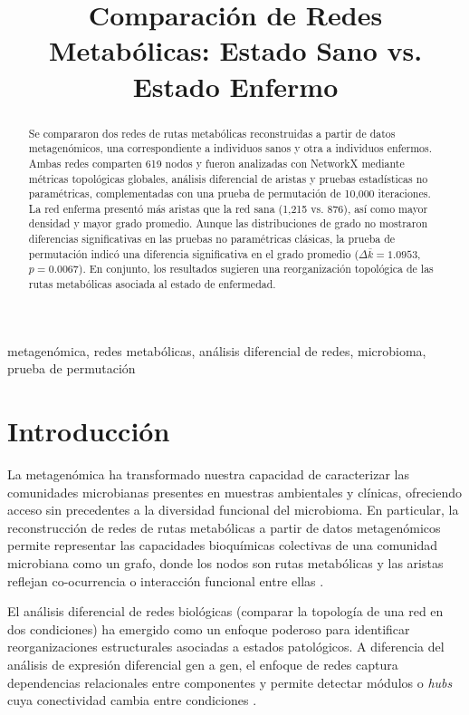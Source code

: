 \documentclass[conference]{IEEEtran}
\title{Comparación de Redes Metabólicas: Estado Sano vs. Estado Enfermo}
\author{
\IEEEauthorblockN{Javier Roberto Rubalcava Cortés}
\IEEEauthorblockA{Posgrado en Ciencias Matemáticas, UNAM\\
Ciudad de México, México}
}
\begin{document}
\maketitle

\begin{abstract}
Se compararon dos redes de rutas metabólicas reconstruidas a partir de datos metagenómicos, una correspondiente a individuos sanos y otra a individuos enfermos. Ambas redes comparten 619 nodos y fueron analizadas con NetworkX mediante métricas topológicas globales, análisis diferencial de aristas y pruebas estadísticas no paramétricas, complementadas con una prueba de permutación de 10,000 iteraciones. La red enferma presentó más aristas que la red sana (1,215 vs. 876), así como mayor densidad y mayor grado promedio. Aunque las distribuciones de grado no mostraron diferencias significativas en las pruebas no paramétricas clásicas, la prueba de permutación indicó una diferencia significativa en el grado promedio ($\Delta \bar{k} = 1.0953$, $p = 0.0067$). En conjunto, los resultados sugieren una reorganización topológica de las rutas metabólicas asociada al estado de enfermedad.
\end{abstract}

\begin{IEEEkeywords}
metagenómica, redes metabólicas, análisis diferencial de redes, microbioma, prueba de permutación
\end{IEEEkeywords}


\section{Introducción}

La metagenómica ha transformado nuestra capacidad de caracterizar las comunidades microbianas presentes en muestras ambientales y clínicas, ofreciendo acceso sin precedentes a la diversidad funcional del microbioma. En particular, la reconstrucción de redes de rutas metabólicas a partir de datos metagenómicos permite representar las capacidades bioquímicas colectivas de una comunidad microbiana como un grafo, donde los nodos son rutas metabólicas y las aristas reflejan co-ocurrencia o interacción funcional entre ellas \cite{mathieu2023insight}.

El análisis diferencial de redes biológicas (comparar la topología de una red en dos condiciones) ha emergido como un enfoque poderoso para identificar reorganizaciones estructurales asociadas a estados patológicos. A diferencia del análisis de expresión diferencial gen a gen, el enfoque de redes captura dependencias relacionales entre componentes y permite detectar módulos o \emph{hubs} cuya conectividad cambia entre condiciones \cite{ideker2012}.
\end{document}
